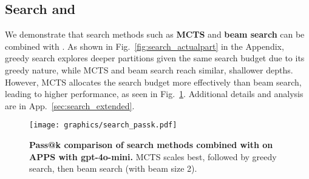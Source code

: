 \vspace{-0.2cm}
\subsection{Search and \decomp}
\vspace{-0.1cm}
\label{sec:search_results}

We demonstrate that search methods such as \textbf{MCTS} and \textbf{beam search} can be combined with \decomp. As shown in Fig.~\ref{fig:search_actualpart} in the Appendix, greedy search explores deeper partitions given the same search budget due to its greedy nature, while MCTS and beam search reach similar, shallower depths. However, MCTS allocates the search budget more effectively than beam search, leading to higher performance, as seen in Fig.~\ref{fig:search_passk}. Additional details and analysis are in App.~\ref{sec:search_extended}.

\begin{figure}
    \centering
    \vspace{-0.2cm}\texttt{[image: graphics/search\_passk.pdf]}
    \vspace{-0.3cm}
    \caption{\textbf{Pass@k comparison of search methods combined with \decomp on APPS with gpt-4o-mini.} MCTS scales best, followed by greedy search, then beam search (with beam size 2).}
    \label{fig:search_passk}\vspace{-0.3cm}
\end{figure}

